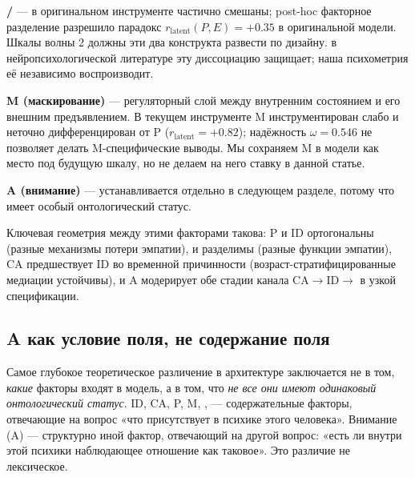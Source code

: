 \textbf{\EAF{} / \Ecog{}} --- в оригинальном инструменте частично смешаны; post-hoc факторное разделение разрешило парадокс $r_{\mathrm{latent}}(P, E) = +0.35$ в оригинальной модели. Шкалы волны 2 должны эти два конструкта развести по дизайну. \citet{shamaytsoory2011} в нейропсихологической литературе эту диссоциацию защищает; наша психометрия её независимо воспроизводит.

\textbf{M (маскирование)} --- регуляторный слой между внутренним состоянием и его внешним предъявлением. В текущем инструменте M инструментирован слабо и неточно дифференцирован от P ($r_{\mathrm{latent}} = +0.82$); надёжность $\omega = 0.546$ не позволяет делать M-специфические выводы. Мы сохраняем M в модели как место под будущую шкалу, но не делаем на него ставку в данной статье.

\textbf{A (внимание)} --- устанавливается отдельно в следующем разделе, потому что имеет особый онтологический статус.

Ключевая геометрия между этими факторами такова: P и ID ортогональны (разные механизмы потери эмпатии), \EAF{} и \Ecog{} разделимы (разные функции эмпатии), CA предшествует ID во временной причинности (возраст-стратифицированные медиации устойчивы), и A модерирует обе стадии канала CA$\to$ID$\to$\EAF{} в узкой спецификации.

\subsection{A как условие поля, не содержание поля}
\label{subsec:A_as_field_condition}

Самое глубокое теоретическое различение в архитектуре \DEIC{} заключается не в том, \emph{какие} факторы входят в модель, а в том, что \emph{не все они имеют одинаковый онтологический статус}. ID, CA, P, M, \EAF{}, \Ecog{} --- содержательные факторы, отвечающие на вопрос «что присутствует в психике этого человека». Внимание (A) --- структурно иной фактор, отвечающий на другой вопрос: «есть ли внутри этой психики наблюдающее отношение как таковое». Это различие не лексическое.


